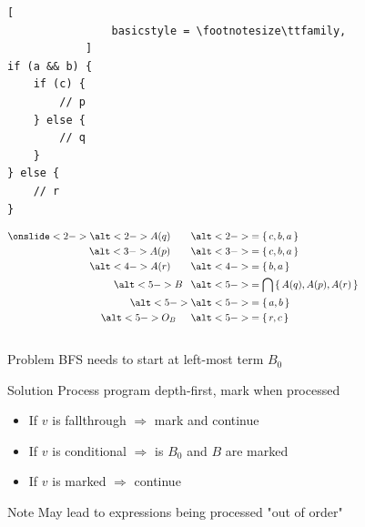 \documentclass[xcolor = {dvipsnames, table}]{beamer}
\newcommand{\disponslide}[2]{%
    \alt<#1>{#2}{\phantom{#2}}
}
\begin{document}
\begin{frame}[fragile]
    \begin{columns}
        \begin{column}{0.5\textwidth}
            \begin{lstlisting}[
                basicstyle = \footnotesize\ttfamily,
            ]
if (a && b) {
    if (c) {
        // p
    } else {
        // q
    }
} else {
    // r
}
            \end{lstlisting}


            \begin{align*}
                    \onslide<2->
                    \disponslide{2-}{A(q)}  & \disponslide{2-}{= \set{c, b, a}} \\
                    \disponslide{3-}{A(p)}  & \disponslide{3-}{= \set{c, b, a}} \\
                    \disponslide{4-}{A(r)}  & \disponslide{4-}{= \set{b, a}   } \\
                    \disponslide{5-}{B}     & \disponslide{5-}{= \bigcap \set{A(q), A(p), A(r)}} \\
                    \disponslide{5-}{}      & \disponslide{5-}{= \set{a, b}} \\
                    \disponslide{5-}{O_B}   & \disponslide{5-}{= \set{r, c}} \\
            \end{align*}
        \end{column}

        \begin{column}{0.4\textwidth}
        \end{column}
        \setbeamercovered{}
    \end{columns}
\end{frame}

\begin{frame}
    \begin{block}{Problem}
        BFS needs to start at left-most term $B_0$
    \end{block}

    \begin{block}{Solution}
        Process program depth-first, mark when processed
    \end{block}

    \begin{itemize}
        \item If $v$ is fallthrough $\Rightarrow$ mark and continue
        \item If $v$ is conditional $\Rightarrow$ is $B_0$ and $B$ are marked
        \item If $v$ is marked $\Rightarrow$ continue
    \end{itemize}

    \begin{block}{Note}
        May lead to expressions being processed "out of order"
    \end{block}
\end{frame}
\end{document}
